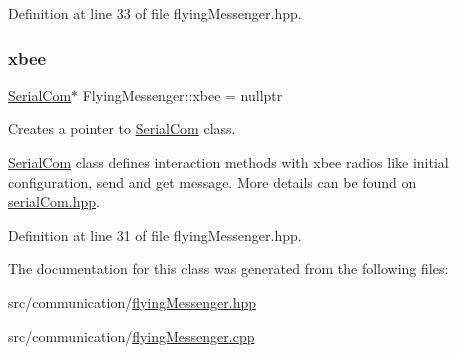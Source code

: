 Definition at line 33 of file flying\+Messenger.\+hpp.

\mbox{\label{class_flying_messenger_a419820a45ea2bc496c10bf36b7b49033}} 
\subsubsection{\texorpdfstring{xbee}{xbee}}
{\footnotesize\ttfamily \hyperlink{class_serial_com}{Serial\+Com}$\ast$ Flying\+Messenger\+::xbee = nullptr\hspace{0.3cm}{\ttfamily [private]}}



Creates a pointer to \hyperlink{class_serial_com}{Serial\+Com} class. 

\hyperlink{class_serial_com}{Serial\+Com} class defines interaction methods with xbee radios like initial configuration, send and get message. More details can be found on \hyperlink{serial_com_8hpp}{serial\+Com.\+hpp}. 

Definition at line 31 of file flying\+Messenger.\+hpp.



The documentation for this class was generated from the following files\+:\begin{DoxyCompactItemize}
\item 
src/communication/\hyperlink{flying_messenger_8hpp}{flying\+Messenger.\+hpp}\item 
src/communication/\hyperlink{flying_messenger_8cpp}{flying\+Messenger.\+cpp}\end{DoxyCompactItemize}
